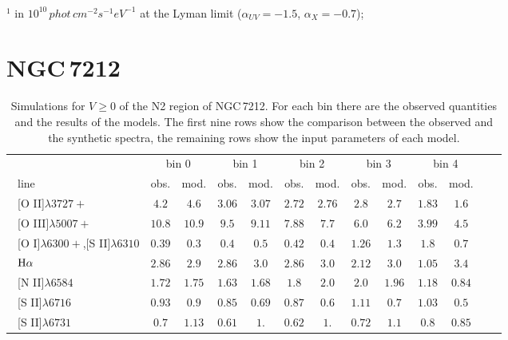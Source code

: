 \documentclass[../thesis.tex]{subfiles}
\begin{document}
\begin{landscape}
\begin{table}
{\begin{tabular}{lcccccc}
\end{tabular}}
\\
$^1$ in $10^{10}\,\si{phot\,cm^{-2} s^{-1} eV^{-1}}$ at the Lyman limit
(${\alpha}_{UV}=-1.5$, ${\alpha}_X=-0.7$);
\end{table}
\end{landscape}
\clearpage

\section{NGC\,7212}
\label{sec:sim_NGC}


\begin{landscape}
\begin{table}

\centering
\caption{Simulations for $V\ge0$ of the N2 region of NGC\,7212. For each bin there are the observed quantities and the results of the models. The first nine rows show the comparison between the observed and the synthetic spectra, the remaining rows show the input parameters of each model.}
\label{tab:sim_N2N+}
\footnotesize{
\begin{tabular}{lcccccccccccc}
\hline
\ &\multicolumn{2}{c}{bin 0} &\multicolumn{2}{c}{bin 1}&\multicolumn{2}{c}{bin 2}&\multicolumn{2}{c}{bin 3}&\multicolumn{2}{c}{bin 4}\\
\   line              &obs.  &mod. & obs.  &mod. &obs.&mod.     &obs.  &mod.&obs.  &mod.\\ \hline
\ [O II]$\lambda3727+$          &$4.2   $&$4.6   $&$3.06   $&$ 3.07 $&$2.72 $&$2.76  $&$2.8   $&$2.7  $&$1.83  $&$1.6   $\\
\  [O III]$\lambda5007+$         &$10.8  $&$10.9  $&$ 9.5   $&$ 9.11 $&$7.8 8$&$7.7   $&$6.0   $&$6.2   $&$3.99  $&$4.5   $\\
\  [O I]$\lambda6300+$,[S II]$\lambda6310$&$0.39  $&$0.3   $&$0.4    $&$0.5   $&$0.42 $&$0.4   $&$1.26  $&$1.3   $&$1.8   $&$0.7   $\\
\ $\rm H\alpha$                 &$2.86  $&$2.9   $&$2.86   $&$ 3.0  $&$2.86 $&$3.0   $&$2.12  $&$3.0   $&$1.05  $&$3.4   $\\
\  [N II]$\lambda6584$           &$1.72  $&$1.75  $&$1.63   $&$ 1.68 $&$1.8  $&$2.0   $&$2.0   $&$1.96  $&$1.18  $&$0.84  $\\
\  [S II]$\lambda6716$           &$0.93  $&$0.9   $&$0.85   $&$ 0.69 $&$0.87 $&$0.6   $&$1.11  $&$0.7   $&$1.03  $&$0.5   $\\
\  [S II]$\lambda6731$           &$0.7   $&$1.13  $&$0.61   $&$ 1.   $&$0.62 $&$1.    $&$0.72  $&$1.1   $&$0.8   $&$0.85  $\\

\end{tabular}}
\end{table}
\end{landscape}
\end{document}
